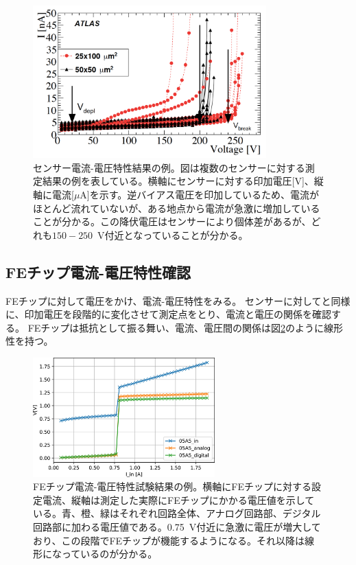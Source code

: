 \begin{figure}[bpt]\centering
\includegraphics[width=9cm]{./sensor_IV_result.png}
\caption[センサー電流-電圧特性結果の例]{センサー電流-電圧特性結果の例\cite{1-1}。図は複数のセンサーに対する測定結果の例を表している。横軸にセンサーに対する印加電圧[V]、縦軸に電流[$\mu$A]を示す。逆バイアス電圧を印加しているため、電流がほとんど流れていないが、ある地点から電流が急激に増加していることが分かる。この降伏電圧はセンサーにより個体差があるが、どれも$150-250$~V付近となっていることが分かる。}
\label{sensor_IV_result}
\end{figure}

\subsection{FEチップ電流-電圧特性確認}
FEチップに対して電圧をかけ、電流-電圧特性をみる。
センサーに対してと同様に、印加電圧を段階的に変化させて測定点をとり、電流と電圧の関係を確認する。
FEチップは抵抗として振る舞い、電流、電圧間の関係は図\ref{SLDO_VI_result}のように線形性を持つ。

\begin{figure}[bpt]\centering
\includegraphics[width=7cm]{./SLDO_VI_result.jpg}
\caption[FEチップ電流-電圧特性試験結果の例。]{FEチップ電流-電圧特性試験結果の例\cite{3-7}。横軸にFEチップに対する設定電流、縦軸は測定した実際にFEチップにかかる電圧値を示している。青、橙、緑はそれぞれ回路全体、アナログ回路部、デジタル回路部に加わる電圧値である。0.75~V付近に急激に電圧が増大しており、この段階でFEチップが機能するようになる。それ以降は線形になっているのが分かる。}
\label{SLDO_VI_result}
\end{figure}

